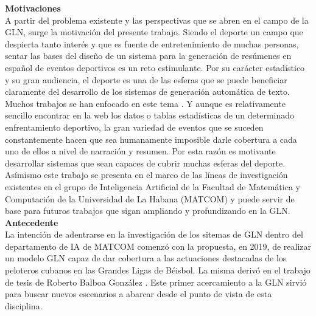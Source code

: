 
   \textbf{Motivaciones}\\

    A partir del problema existente y las perspectivas que se abren en el campo de la GLN, surge la motivación del presente trabajo. Siendo el deporte un campo 
que despierta tanto interés y que es fuente de entretenimiento de muchas personas, sentar las bases del diseño de un sistema para la generación de resúmenes en español de 
eventos deportivos es un reto estimulante. Por su carácter estadístico y su gran audiencia, el deporte es una de las esferas que se puede beneficiar claramente del desarrollo de los sistemas 
de generación automática de texto. Muchos trabajos se han enfocado en este tema . Y aunque es relativamente sencillo encontrar en la web 
los datos o tablas estadísticas de un determinado enfrentamiento deportivo, la gran variedad de eventos que se suceden constantemente hacen 
que sea humanamente imposible darle cobertura a cada uno de ellos a nivel de narración y resumen. Por esta razón es motivante desarrollar  sistemas que sean capaces de cubrir muchas esferas del deporte.\\
Asímismo este trabajo se presenta en el marco de las líneas de investigación existentes en el 
grupo de Inteligencia Artificial de la Facultad de Matemática y Computación de la Universidad de La Habana (MATCOM) y puede servir de base para futuros trabajos que sigan ampliando y profundizando en la GLN.\\


    \textbf{Antecedente}\\

    La intención de adentrarse en la investigación de los sitemas de GLN dentro del departamento de IA de MATCOM comenzó con la propuesta, en 2019, 
de realizar un modelo GLN capaz de dar cobertura a las actuaciones destacadas de los peloteros cubanos en las Grandes Ligas de Béisbol. La misma derivó 
en el trabajo de tesis de Roberto Balboa González . Este primer acercamiento a la GLN sirvió para buscar nuevos escenarios a abarcar 
desde el punto de vista de esta disciplina. %

